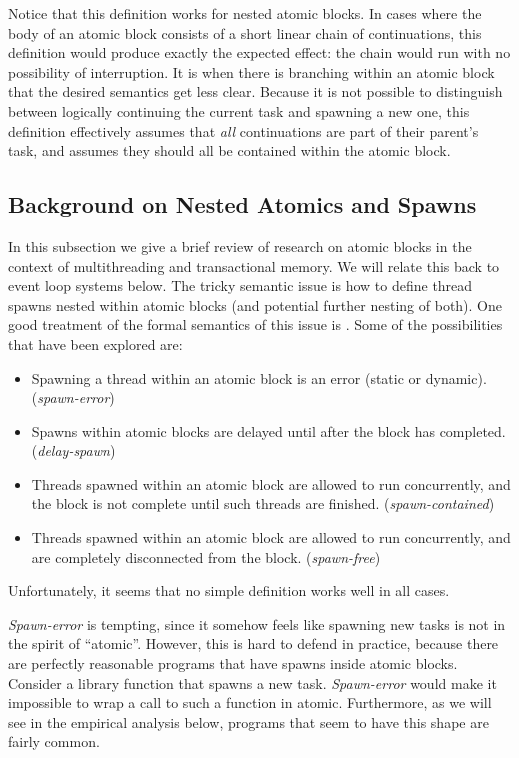 \documentclass[acmsmall,anonymous,review]{acmart}\settopmatter{printfolios=true,printccs=false,printacmref=false}
\begin{document}
Notice that this definition works for nested atomic blocks.
In cases where the body of an atomic block consists of a short linear chain of continuations, this definition would produce exactly the expected effect: the chain would run with no possibility of interruption.
It is when there is branching within an atomic block that the desired semantics get less clear.
Because it is not possible to distinguish between logically continuing the current task and spawning a new one, this definition effectively assumes that \emph{all} continuations are part of their parent's task, and assumes they should all be contained within the atomic block.

\subsection{Background on Nested Atomics and Spawns}

In this subsection we give a brief review of research on atomic blocks in the context of multithreading and transactional memory.
We will relate this back to event loop systems below.
The tricky semantic issue is how to define thread spawns nested within atomic blocks (and potential further nesting of both).
One good treatment of the formal semantics of this issue is \cite{Moore2008}.
Some of the possibilities that have been explored are:
\begin{itemize}
\item Spawning a thread within an atomic block is an error (static or dynamic). (\emph{spawn-error})
\item Spawns within atomic blocks are delayed until after the block has completed. (\emph{delay-spawn})
\item Threads spawned within an atomic block are allowed to run concurrently, and the block is not complete until such threads are finished. (\emph{spawn-contained})
\item Threads spawned within an atomic block are allowed to run concurrently, and are completely disconnected from the block. (\emph{spawn-free})
\end{itemize}

Unfortunately, it seems that no simple definition works well in all cases.

\emph{Spawn-error} is tempting, since it somehow feels like spawning new tasks is not in the spirit of ``atomic''.
However, this is hard to defend in practice, because there are perfectly reasonable programs that have spawns inside atomic blocks.
Consider a library function that spawns a new task.
\emph{Spawn-error} would make it impossible to wrap a call to such a function in atomic.
Furthermore, as we will see in the empirical analysis below, programs that seem to have this shape are fairly common.
\end{document}
